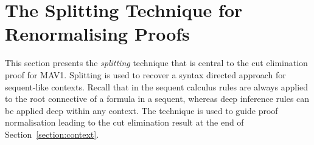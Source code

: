 \documentclass[UKenglish,acmsmall,authorversion]{acmart}
\theoremstyle{plain}
\begin{document}
\section{The Splitting Technique for Renormalising Proofs}
\label{section:splitting}

This section presents the \textit{splitting} technique that is central to the cut elimination proof for \textsf{MAV1}.
Splitting is used to recover a syntax directed approach for sequent-like contexts.
Recall that in the sequent calculus rules are always applied to the root connective of a formula in a sequent, whereas deep inference rules can be applied deep within any context.
The technique is used to guide proof normalisation
leading to the cut elimination result at the end of Section~\ref{section:context}.
\end{document}

